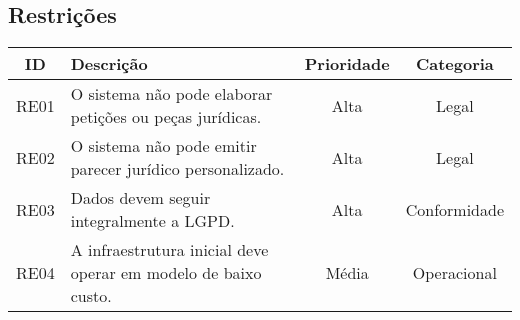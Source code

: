 \documentclass{article}
\begin{document}
\subsection*{Restrições}
\begin{tabular}{|c|p{7cm}|c|c|}
\hline
\textbf{ID} & \textbf{Descrição} & \textbf{Prioridade} & \textbf{Categoria} \\
\hline
RE01&	O sistema não pode elaborar petições ou peças jurídicas.&	Alta&	Legal\\\hline
RE02&	O sistema não pode emitir parecer jurídico personalizado.&	Alta&	Legal\\\hline
RE03&	Dados devem seguir integralmente a LGPD.&	Alta	&Conformidade\\\hline
RE04&	A infraestrutura inicial deve operar em modelo de baixo custo.&	Média&	Operacional\\
\hline


    
\end{tabular}


   
    
\end{document}

